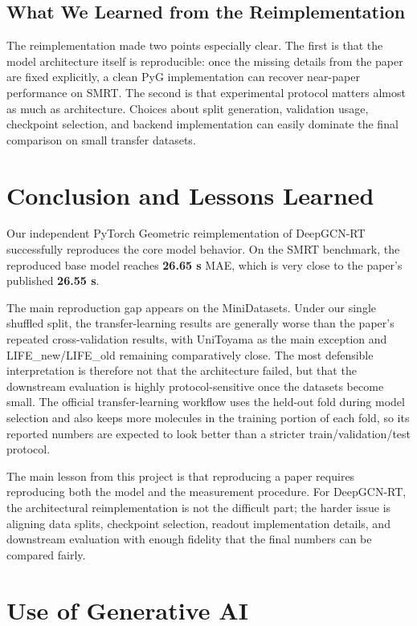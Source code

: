\subsection{What We Learned from the Reimplementation}

The reimplementation made two points especially clear. The first is that the model architecture itself is reproducible: once the missing details from the paper are fixed explicitly, a clean PyG implementation can recover near-paper performance on SMRT. The second is that experimental protocol matters almost as much as architecture. Choices about split generation, validation usage, checkpoint selection, and backend implementation can easily dominate the final comparison on small transfer datasets.

\section{Conclusion and Lessons Learned}

Our independent PyTorch Geometric reimplementation of DeepGCN-RT successfully reproduces the core model behavior. On the SMRT benchmark, the reproduced base model reaches \textbf{26.65 s} MAE, which is very close to the paper's published \textbf{26.55 s}.

The main reproduction gap appears on the MiniDatasets. Under our single shuffled split, the transfer-learning results are generally worse than the paper's repeated cross-validation results, with UniToyama as the main exception and LIFE\_new/LIFE\_old remaining comparatively close. The most defensible interpretation is therefore not that the architecture failed, but that the downstream evaluation is highly protocol-sensitive once the datasets become small. The official transfer-learning workflow uses the held-out fold during model selection and also keeps more molecules in the training portion of each fold, so its reported numbers are expected to look better than a stricter train/validation/test protocol.

The main lesson from this project is that reproducing a paper requires reproducing both the model and the measurement procedure. For DeepGCN-RT, the architectural reimplementation is not the difficult part; the harder issue is aligning data splits, checkpoint selection, readout implementation details, and downstream evaluation with enough fidelity that the final numbers can be compared fairly.


\section*{Use of Generative AI}

